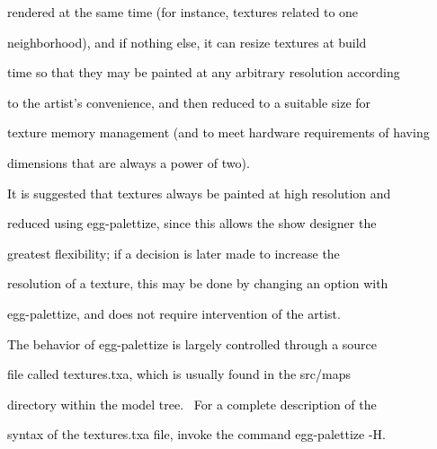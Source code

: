\documentclass[a4paper]{article}
\newcommand\textstyleOOoComputerKeyWord[1]{\textrm{\textcolor[rgb]{0.0,0.0,0.5019608}{#1}}}
\begin{document}
{\color{black}
\textstyleOOoComputerKeyWord{\textcolor{black}{rendered at the same time (for instance, textures related to one}}}

{\color{black}
\textstyleOOoComputerKeyWord{\textcolor{black}{neighborhood), and if nothing else, it can resize textures at build}}}

{\color{black}
\textstyleOOoComputerKeyWord{\textcolor{black}{time so that they may be painted at any arbitrary resolution according}}}

{\color{black}
\textstyleOOoComputerKeyWord{\textcolor{black}{to the artist's convenience, and then reduced to a suitable size for}}}

{\color{black}
\textstyleOOoComputerKeyWord{\textcolor{black}{texture memory management (and to meet hardware requirements of having}}}

{\color{black}
\textstyleOOoComputerKeyWord{\textcolor{black}{dimensions that are always a power of two).}}}


\bigskip

{\color{black}
\textstyleOOoComputerKeyWord{\textcolor{black}{It is suggested that textures always be painted at high resolution and}}}

{\color{black}
\textstyleOOoComputerKeyWord{\textcolor{black}{reduced using egg-palettize, since this allows the show designer the}}}

{\color{black}
\textstyleOOoComputerKeyWord{\textcolor{black}{greatest flexibility; if a decision is later made to increase the}}}

{\color{black}
\textstyleOOoComputerKeyWord{\textcolor{black}{resolution of a texture, this may be done by changing an option with}}}

{\color{black}
\textstyleOOoComputerKeyWord{\textcolor{black}{egg-palettize, and does not require intervention of the artist.}}}


\bigskip

{\color{black}
\textstyleOOoComputerKeyWord{\textcolor{black}{The behavior of egg-palettize is largely controlled through a source}}}

{\color{black}
\textstyleOOoComputerKeyWord{\textcolor{black}{file called textures.txa, which is usually found in the src/maps}}}

{\color{black}
\textstyleOOoComputerKeyWord{\textcolor{black}{directory within the model tree. \ For a complete description of the}}}

{\color{black}
\textstyleOOoComputerKeyWord{\textcolor{black}{syntax of the textures.txa file, invoke the command egg-palettize -H.}}}
\end{document}
